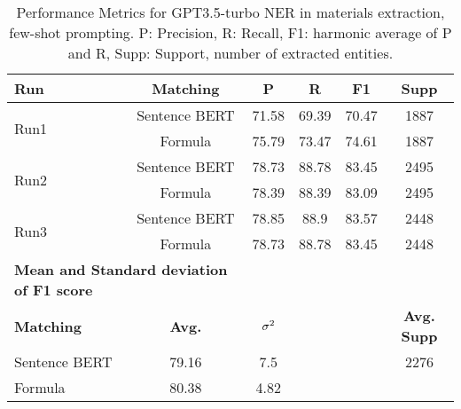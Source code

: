 \begin{table}[htbp]
\small
  \centering
  \caption{Performance Metrics for GPT3.5-turbo NER in materials extraction, few-shot prompting. P: Precision, R: Recall, F1: harmonic average of P and R, Supp: Support, number of extracted entities.}
  \begin{tabular}{lccccc}
    \toprule
    \textbf{Run} & \textbf{Matching} & \textbf{P} & \textbf{R} & \textbf{F1} & \textbf{Supp} \\
    \midrule
    \multirow{2}{*}{Run1} & Sentence BERT & 71.58 & 69.39 & 70.47 & 1887 \\
    & Formula & 75.79 & 73.47 & 74.61 & 1887 \\
    \midrule
    \multirow{2}{*}{Run2} & Sentence BERT & 78.73 & 88.78 & 83.45 & 2495 \\
    & Formula & 78.39 & 88.39 & 83.09 & 2495 \\
    \midrule
    \multirow{2}{*}{Run3} & Sentence BERT & 78.85 & 88.9 & 83.57 & 2448 \\
    & Formula & 78.73 & 88.78 & 83.45 & 2448 \\
    \midrule
    \multicolumn{2}{l}{\textbf{Mean and Standard deviation of F1 score}} & & & & \\
    \midrule
    \textbf{Matching} & \textbf{Avg.} & $\sigma\textsuperscript{2}$ & & & \textbf{Avg. Supp}\\
    Sentence BERT & 79.16 & 7.5 & & & 2276 \\
    Formula & 80.38 & 4.82 & & & \\
    \bottomrule
  \end{tabular}
\end{table}


